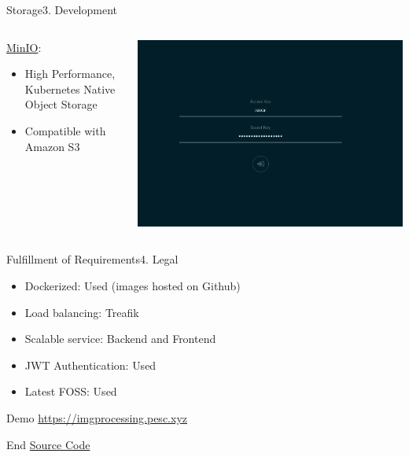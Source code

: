 \documentclass[aspectratio=169,20pt]{beamer}
\begin{document}
\begin{frame}{Storage}{3. Development}
	\begin{columns}[onlytextwidth,T]
		\begin{column}{.40\linewidth}
			\underline{MinIO}:
			\vspace{1in}
			\begin{itemize}
				\item{High Performance, Kubernetes Native Object Storage}
				\item{Compatible with Amazon S3}
			\end{itemize}
		\end{column}
		\begin{column}{.60\linewidth}
			\includegraphics[scale=0.30]{minio}
		\end{column}
	\end{columns}
\end{frame}

\begin{frame}{Fulfillment of Requirements}{4. Legal}
	\begin{itemize}
		\item{Dockerized: \textcolor{deepgreen}{Used (images hosted on Github)}}
		\item{Load balancing: \textcolor{deepgreen}{Treafik}}
		\item{Scalable service: \textcolor{deepgreen}{Backend and Frontend}}
		\item{JWT Authentication: \textcolor{deepgreen}{Used}}
		\item{Latest FOSS: \textcolor{deepgreen}{Used}}
	\end{itemize}
\end{frame}

\begin{frame}{Demo}{}
	\href{https://imgprocessing.pesc.xyz/}{https://imgprocessing.pesc.xyz}
\end{frame}

\begin{frame}{End}{}
	\href{https://github.com/imgProcessing/backend}{Source Code}
\end{frame}
\end{document}
